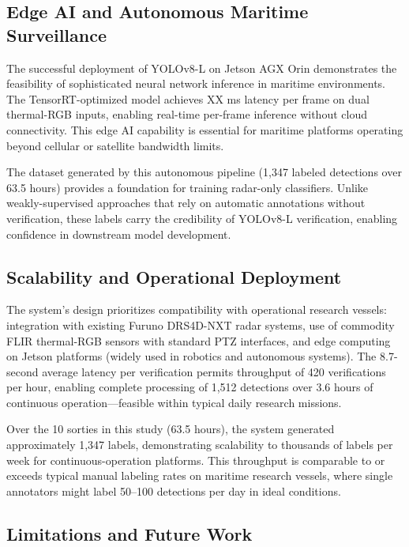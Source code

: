 \documentclass[twocolumn, 10pt]{article}
\begin{document}
\subsection{Edge AI and Autonomous Maritime Surveillance}

The successful deployment of YOLOv8-L on Jetson AGX Orin demonstrates the feasibility of sophisticated neural network inference in maritime environments. The TensorRT-optimized model achieves XX ms latency per frame on dual thermal-RGB inputs, enabling real-time per-frame inference without cloud connectivity. This edge AI capability is essential for maritime platforms operating beyond cellular or satellite bandwidth limits.

The dataset generated by this autonomous pipeline (1,347 labeled detections over 63.5 hours) provides a foundation for training radar-only classifiers. Unlike weakly-supervised approaches that rely on automatic annotations without verification, these labels carry the credibility of YOLOv8-L verification, enabling confidence in downstream model development.

\subsection{Scalability and Operational Deployment}

The system's design prioritizes compatibility with operational research vessels: integration with existing Furuno DRS4D-NXT radar systems, use of commodity FLIR thermal-RGB sensors with standard PTZ interfaces, and edge computing on Jetson platforms (widely used in robotics and autonomous systems). The 8.7-second average latency per verification permits throughput of 420 verifications per hour, enabling complete processing of 1,512 detections over 3.6 hours of continuous operation—feasible within typical daily research missions.

Over the 10 sorties in this study (63.5 hours), the system generated approximately 1,347 labels, demonstrating scalability to thousands of labels per week for continuous-operation platforms. This throughput is comparable to or exceeds typical manual labeling rates on maritime research vessels, where single annotators might label 50--100 detections per day in ideal conditions.

\subsection{Limitations and Future Work}
\end{document}
